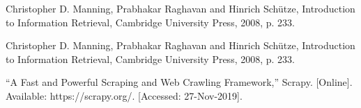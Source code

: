 \cleardoublepage
{}
{}
\begin{thebibliography}{99}

    Christopher D. Manning, Prabhakar Raghavan and Hinrich Schütze, Introduction to Information Retrieval, Cambridge University Press, 2008, p. 233.

    Christopher D. Manning, Prabhakar Raghavan and Hinrich Schütze, Introduction to Information Retrieval, Cambridge University Press, 2008, p. 233.

     “A Fast and Powerful Scraping and Web Crawling Framework,” Scrapy. [Online]. Available: https://scrapy.org/. [Accessed: 27-Nov-2019].

\end{thebibliography}